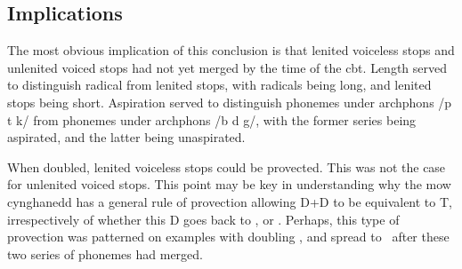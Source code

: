 \subsection{Implications}
The most obvious implication of this conclusion is that lenited voiceless stops and unlenited voiced stops had not yet merged by the time of the \gls{cbt}. Length served to distinguish radical from lenited stops, with radicals being long, and lenited stops being short. Aspiration served to distinguish phonemes under \gls{archphon}s /p t k/ from phonemes under \gls{archphon}s /b d g/, with the former series being aspirated, and the latter being unaspirated.

When doubled, lenited voiceless stops could be provected. This was not the case for unlenited voiced stops. This point may be key in understanding why the \gls{mow} cynghanedd has a general rule of provection allowing \gls{D}+\gls{D} to be equivalent to \gls{T}, irrespectively of whether this \gls{D} goes back to \lT, or \xD. Perhaps, this type of provection was patterned on examples with doubling \lT, and spread to \xD\ after these two series of phonemes had merged.

